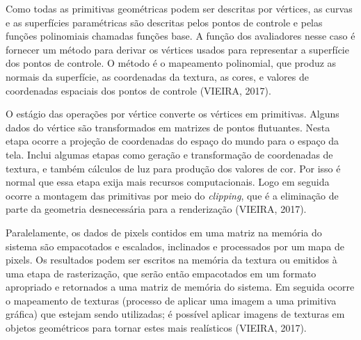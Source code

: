	\begin{figure}[h!]
		\centering
	\end{figure}
	\nocite{pipeline}
	
Como todas as primitivas geométricas podem ser descritas por vértices, as curvas e as superfícies paramétricas são descritas pelos pontos de controle e pelas funções polinomiais chamadas funções base. A função dos avaliadores nesse caso é fornecer um método para derivar os vértices usados para representar a superfície dos pontos de controle. O método é o mapeamento polinomial, que produz as normais da superfície, as coordenadas da textura, as cores, e valores de coordenadas espaciais dos pontos de controle (VIEIRA, 2017).

O estágio das operações por vértice converte os vértices em primitivas. Alguns dados do vértice são transformados em matrizes de pontos flutuantes. Nesta etapa ocorre a projeção de coordenadas do espaço do mundo para o espaço da tela. Inclui algumas etapas como geração e transformação de coordenadas de textura, e também cálculos de luz para produção dos valores de cor. Por isso é normal que essa etapa exija mais recursos computacionais. Logo em seguida ocorre a montagem das primitivas por meio do \textit{clipping}, que é a eliminação de parte da geometria desnecessária para a renderização (VIEIRA, 2017).

Paralelamente, os dados de pixels contidos em uma matriz na memória do sistema são empacotados e escalados, inclinados e processados por um mapa de pixels. Os resultados podem ser escritos na memória da textura ou emitidos à uma etapa de rasterização, que serão então empacotados em um formato apropriado e retornados a uma matriz de memória do sistema. Em seguida ocorre o mapeamento de texturas (processo de aplicar uma imagem a uma primitiva gráfica) que estejam sendo utilizadas; é possível aplicar imagens de texturas em objetos geométricos para tornar estes mais realísticos (VIEIRA, 2017).

